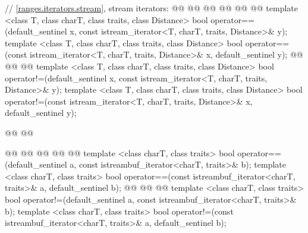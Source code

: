 \begin{codeblock}
{{    // \ref{ranges.iterators.stream}, stream iterators:
    @@
        @@
    @@
    @@
      @@
              @@
    template <class T, class charT, class traits, class Distance>
      bool operator==(default_sentinel x,
              const istream_iterator<T, charT, traits, Distance>& y);
    template <class T, class charT, class traits, class Distance>
      bool operator==(const istream_iterator<T, charT, traits, Distance>& x,
              default_sentinel y);
    @@
      @@
              @@
    template <class T, class charT, class traits, class Distance>
    bool operator!=(default_sentinel x,
              const istream_iterator<T, charT, traits, Distance>& y);
    template <class T, class charT, class traits, class Distance>
      bool operator!=(const istream_iterator<T, charT, traits, Distance>& x,
              default_sentinel y);

    @@
        @@

    @@
      @@
    @@
      @@
              @@
    template <class charT, class traits>
      bool operator==(default_sentinel a,
              const istreambuf_iterator<charT, traits>& b);
    template <class charT, class traits>
      bool operator==(const istreambuf_iterator<charT, traits>& a,
              default_sentinel b);
    @@
      @@
              @@
    template <class charT, class traits>
      bool operator!=(default_sentinel a,
              const istreambuf_iterator<charT, traits>& b);
    template <class charT, class traits>
      bool operator!=(const istreambuf_iterator<charT, traits>& a,
              default_sentinel b);

}}
\end{codeblock}
